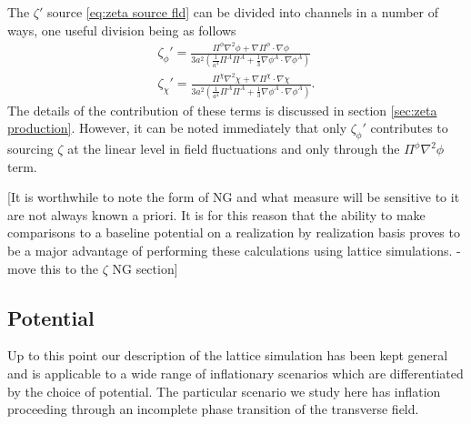 The $\zeta'$ source \eqref{eq:zeta source fld} can be divided into channels in a number of ways, one useful division being as follows
\begin{align}
  \zeta_\phi' = \frac{\Pi^\phi\nabla^2\phi + \nabla\Pi^\phi\cdot\nabla\phi}{3a^2\left(\frac{1}{a^4}\Pi^A\Pi^A + \frac{1}{3}\nabla\phi^A\cdot\nabla\phi^A \right)} \\
  \zeta_\chi' = \frac{\Pi^\chi\nabla^2\chi + \nabla\Pi^\chi\cdot\nabla\chi}{3a^2\left(\frac{1}{a^4}\Pi^A\Pi^A + \frac{1}{3}\nabla\phi^A\cdot\nabla\phi^A \right)}.
\end{align}
The details of the contribution of these terms is discussed in section \ref{sec:zeta production}.
However, it can be noted immediately that only $\zeta_\phi'$ contributes to sourcing $\zeta$ at the linear level in field fluctuations and only through the $\Pi^\phi\nabla^2\phi$ term.

[It is worthwhile to note the form of NG and what measure will be sensitive to it are not always known a priori.
It is for this reason that the ability to make comparisons to a baseline potential on a realization by realization basis proves to be a major advantage of performing these calculations using lattice simulations. - move this to the $\zeta$ NG section]


\subsection{Potential}
Up to this point our description of the lattice simulation has been kept general and is applicable to a wide range of inflationary scenarios which are differentiated by the choice of potential. The particular scenario we study here has inflation proceeding through an incomplete phase transition of the transverse field. 

